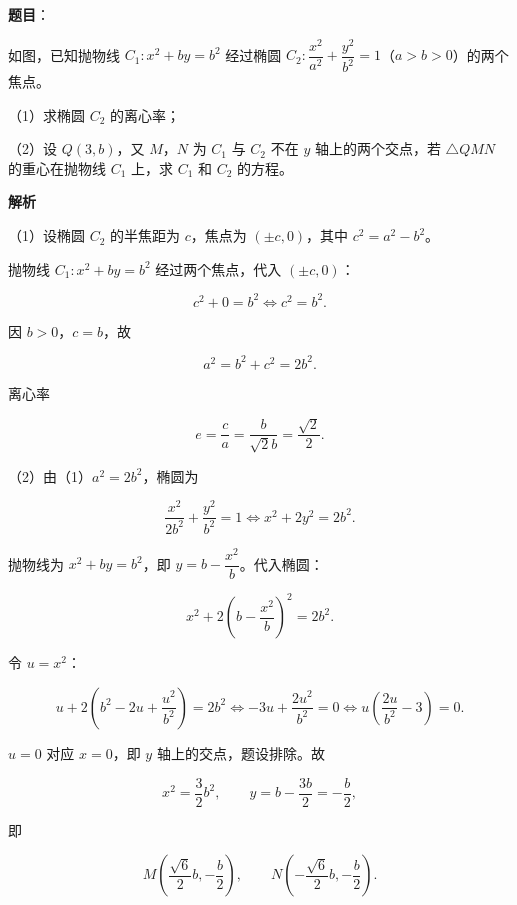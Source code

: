 \begin{answer}

\textbf{题目}：

如图，已知抛物线 $C_1:x^2+by=b^2$ 经过椭圆 $C_2:\dfrac{x^2}{a^2}+\dfrac{y^2}{b^2}=1$（$a>b>0$）的两个焦点。

（1）求椭圆 $C_2$ 的离心率；

（2）设 $Q(3,b)$，又 $M$，$N$ 为 $C_1$ 与 $C_2$ 不在 $y$ 轴上的两个交点，若 $\triangle QMN$ 的重心在抛物线 $C_1$ 上，求 $C_1$ 和 $C_2$ 的方程。
\nopagebreak[4]
\begin{center}\end{center}
\nopagebreak[4]
\textbf{解析}

（1）设椭圆 $C_2$ 的半焦距为 $c$，焦点为 $(\pm c,0)$，其中 $c^2=a^2-b^2$。

抛物线 $C_1:x^2+by=b^2$ 经过两个焦点，代入 $(\pm c,0)$：

\nopagebreak[4]
\[c^2+0=b^2\iff c^2=b^2.\]

因 $b>0$，$c=b$，故

\nopagebreak[4]
\[a^2=b^2+c^2=2b^2.\]

离心率

\nopagebreak[4]
\[e=\frac ca=\frac b{\sqrt2b}=\frac{\sqrt2}2.\]

（2）由（1）$a^2=2b^2$，椭圆为

\nopagebreak[4]
\[\frac{x^2}{2b^2}+\frac{y^2}{b^2}=1\iff x^2+2y^2=2b^2.\]

抛物线为 $x^2+by=b^2$，即 $y=b-\dfrac{x^2}b$。代入椭圆：

\nopagebreak[4]
\[x^2+2\left(b-\frac{x^2}b\right)^2=2b^2.\]

令 $u=x^2$：

\nopagebreak[4]
\[u+2\left(b^2-2u+\frac{u^2}{b^2}\right)=2b^2
\iff -3u+\frac{2u^2}{b^2}=0
\iff u\left(\frac{2u}{b^2}-3\right)=0.\]

$u=0$ 对应 $x=0$，即 $y$ 轴上的交点，题设排除。故

\nopagebreak[4]
\[x^2=\frac32b^2,\qquad y=b-\frac{3b}{2}=-\frac b2,\]

即

\nopagebreak[4]
\[M\left(\frac{\sqrt6}2b,-\frac b2\right),\qquad
N\left(-\frac{\sqrt6}2b,-\frac b2\right).\]


\end{answer}
